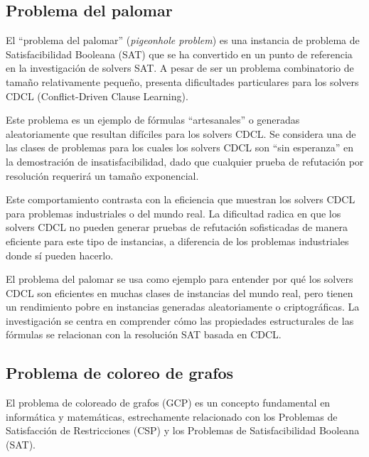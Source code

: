 \subsection{Problema del palomar}
\label{subsec:pingeonhole}
El ``problema del palomar'' (\textit{pigeonhole problem}) es una instancia de problema de Satisfacibilidad Booleana (SAT) que se ha convertido en un punto de referencia en la investigación de solvers SAT. A pesar de ser un problema combinatorio de tamaño relativamente pequeño, presenta dificultades particulares para los solvers CDCL (Conflict-Driven Clause Learning).

Este problema es un ejemplo de fórmulas “artesanales” o generadas aleatoriamente que resultan difíciles para los solvers CDCL. %
Se considera una de las clases de problemas para los cuales los solvers CDCL son ``sin esperanza'' en la demostración de insatisfacibilidad, dado que cualquier prueba de refutación por resolución requerirá un tamaño exponencial. %

Este comportamiento contrasta con la eficiencia que muestran los solvers CDCL para problemas industriales o del mundo real. %
La dificultad radica en que los solvers CDCL no pueden generar pruebas de refutación sofisticadas de manera eficiente para este tipo de instancias, a diferencia de los problemas industriales donde sí pueden hacerlo. %

El problema del palomar se usa como ejemplo para entender por qué los solvers CDCL son eficientes en muchas clases de instancias del mundo real, pero tienen un rendimiento pobre en instancias generadas aleatoriamente o criptográficas. %
La investigación se centra en comprender cómo las propiedades estructurales de las fórmulas se relacionan con la resolución SAT basada en CDCL. %

\subsection{Problema de coloreo de grafos}
\label{subsec:graph-coloring}
El problema de coloreado de grafos (GCP) es un concepto fundamental en informática y matemáticas, estrechamente relacionado con los Problemas de Satisfacción de Restricciones (CSP) y los Problemas de Satisfacibilidad Booleana (SAT). %

